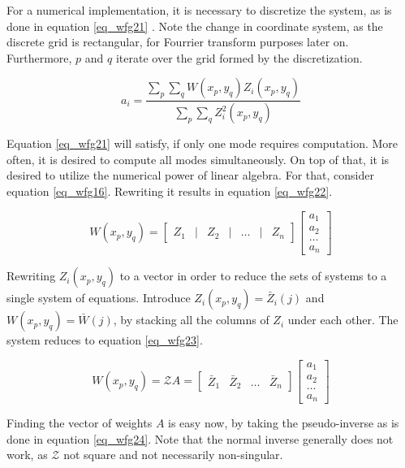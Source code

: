 \documentclass{article}
\begin{document}
For a numerical implementation, it is necessary to discretize the system, as is done in equation \ref{eq_wfg21} \cite{zernikeMatlab}. Note the change in coordinate system, as the discrete grid is rectangular, for Fourrier transform purposes later on. Furthermore, $p$ and $q$ iterate over the grid formed by the discretization.

\begin{equation}
a_i = \frac{\sum \limits_p \sum \limits_q W(x_p,y_q) Z_i(x_p,y_q) }{\sum \limits_p \sum \limits_q Z_{i}^{2}(x_p,y_q) } 
\label{eq_wfg21}
\end{equation}

\newpage
Equation \ref{eq_wfg21} will satisfy, if only one mode requires computation. More often, it is desired to compute all modes simultaneously. On top of that, it is desired to utilize the numerical power of linear algebra.
For that, consider equation \ref{eq_wfg16}. Rewriting it results in equation \ref{eq_wfg22}.

\begin{equation}
W(x_p,y_q) = 
\begin{bmatrix}
Z_1 & | & Z_2 & | & \dots & | & Z_n
\end{bmatrix}
\begin{bmatrix}
a_1 \\
a_2 \\
\dots \\
a_n
\end{bmatrix}
\label{eq_wfg22}
\end{equation}

Rewriting $Z_i(x_p,y_q)$ to a vector in order to reduce the sets of systems to a single system of equations. Introduce $Z_i(x_p,y_q) = \bar{Z}_i(j)$ and $W(x_p,y_q) = \bar{W}(j)$, by stacking all the columns of $Z_i$ under each other. The system reduces to equation \ref{eq_wfg23}.

\begin{equation}
W(x_p,y_q) = \mathcal{Z}A = 
\begin{bmatrix}
\bar{Z}_1 & \bar{Z}_2 & \dots & \bar{Z}_n
\end{bmatrix}
\begin{bmatrix}
a_1 \\
a_2 \\
\dots \\
a_n
\end{bmatrix}
\label{eq_wfg23}
\end{equation}

Finding the vector of weights $A$ is easy now, by taking the pseudo-inverse as is done in equation \ref{eq_wfg24}. Note that the normal inverse generally does not work, as $\mathcal{Z}$ not square and not necessarily non-singular.
\end{document}

